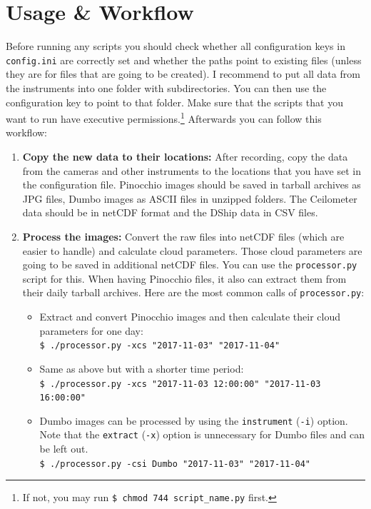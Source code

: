 \documentclass[11pt,a4paper]{article}
\begin{document}
\section{Usage \& Workflow}
\label{sec:usage-workflow}
Before running any scripts you should check whether all configuration keys in \texttt{config.ini} are correctly set and whether the paths point to existing files (unless they are for files that are going to be created). I recommend to put all data from the instruments into one folder with subdirectories. You can then use the configuration key  to point to that folder. Make sure that the scripts that you want to run have executive permissions.\footnote{If not, you may run \texttt{\$ chmod 744 script\_name.py} first.} Afterwards you can follow this workflow:

\begin{enumerate}
	\item \textbf{Copy the new data to their locations:} After recording, copy the data from the cameras and other instruments to the locations that you have set in the configuration file. Pinocchio images should be saved in tarball archives as JPG files, Dumbo images as ASCII files in unzipped folders. The Ceilometer data should be in netCDF format and the DShip data in CSV files.
	\item \textbf{Process the images:} Convert the raw files into netCDF files (which are easier to handle) and calculate cloud parameters. Those cloud parameters are going to be saved in additional netCDF files. You can use the \texttt{processor.py} script for this. When having Pinocchio files, it also can extract them from their daily tarball archives. Here are the most common calls of \texttt{processor.py}:
	\begin{itemize}
		\item Extract and convert Pinocchio images and then calculate their cloud parameters for one day:\\
		\texttt{\$ ./processor.py -xcs "2017-11-03" "2017-11-04" }
		\item Same as above but with a shorter time period:\\
		\texttt{\$ ./processor.py -xcs "2017-11-03 12:00:00" "2017-11-03 16:00:00" }
		\item Dumbo images can be processed by using the \texttt{instrument} (\texttt{-i}) option. Note that the \texttt{extract} (\texttt{-x}) option is unnecessary for Dumbo files and can be left out.\\
		\texttt{\$ ./processor.py -csi Dumbo "2017-11-03" "2017-11-04" }

\end{itemize}
\end{enumerate}
\end{document}
